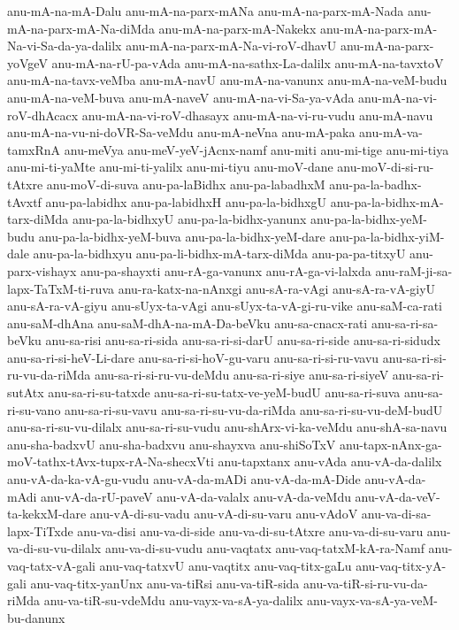 {anu-mA-na-mA-Dalu
anu-mA-na-parx-mANa
anu-mA-na-parx-mA-Nada
anu-mA-na-parx-mA-Na-diMda
anu-mA-na-parx-mA-Nakekx
anu-mA-na-parx-mA-Na-vi-Sa-da-ya-dalilx
anu-mA-na-parx-mA-Na-vi-roV-dhavU
anu-mA-na-parx-yoVgeV
anu-mA-na-rU-pa-vAda
anu-mA-na-sathx-La-dalilx
anu-mA-na-tavxtoV
anu-mA-na-tavx-veMba
anu-mA-navU
anu-mA-na-vanunx
anu-mA-na-veM-budu
anu-mA-na-veM-buva
anu-mA-naveV
anu-mA-na-vi-Sa-ya-vAda
anu-mA-na-vi-roV-dhAcacx
anu-mA-na-vi-roV-dhasayx
anu-mA-na-vi-ru-vudu
anu-mA-navu
anu-mA-na-vu-ni-doVR-Sa-veMdu
anu-mA-neVna
anu-mA-paka
anu-mA-va-tamxRnA
anu-meVya
anu-meV-yeV-jAcnx-namf
anu-miti
anu-mi-tige
anu-mi-tiya
anu-mi-ti-yaMte
anu-mi-ti-yalilx
anu-mi-tiyu
anu-moV-dane
anu-moV-di-si-ru-tAtxre
anu-moV-di-suva
anu-pa-laBidhx
anu-pa-labadhxM
anu-pa-la-badhx-tAvxtf
anu-pa-labidhx
anu-pa-labidhxH
anu-pa-la-bidhxgU
anu-pa-la-bidhx-mA-tarx-diMda
anu-pa-la-bidhxyU
anu-pa-la-bidhx-yanunx
anu-pa-la-bidhx-yeM-budu
anu-pa-la-bidhx-yeM-buva
anu-pa-la-bidhx-yeM-dare
anu-pa-la-bidhx-yiM-dale
anu-pa-la-bidhxyu
anu-pa-li-bidhx-mA-tarx-diMda
anu-pa-pa-titxyU
anu-parx-vishayx
anu-pa-shayxti
anu-rA-ga-vanunx
anu-rA-ga-vi-lalxda
anu-raM-ji-sa-lapx-TaTxM-ti-ruva
anu-ra-katx-na-nAnxgi
anu-sA-ra-vAgi
anu-sA-ra-vA-giyU
anu-sA-ra-vA-giyu
anu-sUyx-ta-vAgi
anu-sUyx-ta-vA-gi-ru-vike
anu-saM-ca-rati
anu-saM-dhAna
anu-saM-dhA-na-mA-Da-beVku
anu-sa-cnacx-rati
anu-sa-ri-sa-beVku
anu-sa-risi
anu-sa-ri-sida
anu-sa-ri-si-darU
anu-sa-ri-side
anu-sa-ri-sidudx
anu-sa-ri-si-heV-Li-dare
anu-sa-ri-si-hoV-gu-varu
anu-sa-ri-si-ru-vavu
anu-sa-ri-si-ru-vu-da-riMda
anu-sa-ri-si-ru-vu-deMdu
anu-sa-ri-siye
anu-sa-ri-siyeV
anu-sa-ri-sutAtx
anu-sa-ri-su-tatxde
anu-sa-ri-su-tatx-ve-yeM-budU
anu-sa-ri-suva
anu-sa-ri-su-vano
anu-sa-ri-su-vavu
anu-sa-ri-su-vu-da-riMda
anu-sa-ri-su-vu-deM-budU
anu-sa-ri-su-vu-dilalx
anu-sa-ri-su-vudu
anu-shArx-vi-ka-veMdu
anu-shA-sa-navu
anu-sha-badxvU
anu-sha-badxvu
anu-shayxva
anu-shiSoTxV
anu-tapx-nAnx-ga-moV-tathx-tAvx-tupx-rA-Na-shecxVti
anu-tapxtanx
anu-vAda
anu-vA-da-dalilx
anu-vA-da-ka-vA-gu-vudu
anu-vA-da-mADi
anu-vA-da-mA-Dide
anu-vA-da-mAdi
anu-vA-da-rU-paveV
anu-vA-da-valalx
anu-vA-da-veMdu
anu-vA-da-veV-ta-kekxM-dare
anu-vA-di-su-vadu
anu-vA-di-su-varu
anu-vAdoV
anu-va-di-sa-lapx-TiTxde
anu-va-disi
anu-va-di-side
anu-va-di-su-tAtxre
anu-va-di-su-varu
anu-va-di-su-vu-dilalx
anu-va-di-su-vudu
anu-vaqtatx
anu-vaq-tatxM-kA-ra-Namf
anu-vaq-tatx-vA-gali
anu-vaq-tatxvU
anu-vaqtitx
anu-vaq-titx-gaLu
anu-vaq-titx-yA-gali
anu-vaq-titx-yanUnx
anu-va-tiRsi
anu-va-tiR-sida
anu-va-tiR-si-ru-vu-da-riMda
anu-va-tiR-su-vdeMdu
anu-vayx-va-sA-ya-dalilx
anu-vayx-va-sA-ya-veM-bu-danunx
}

